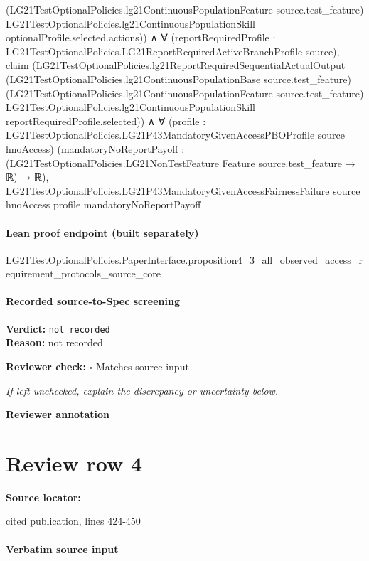 \documentclass[10pt]{article}
\newcommand{\reviewerbox}{%
  \par\noindent\fbox{\parbox{0.96\linewidth}{\rule{0pt}{0.38in}}}\par
}
\newcommand{\reviewmatch}[1]{%
  \par\noindent\textbf{Reviewer check:} $\square$\; #1\par
  \noindent\emph{If left unchecked, explain the discrepancy or uncertainty below.}\par
}
\begin{document}
\begin{ReviewVerbatim}
              (LG21TestOptionalPolicies.lg21ContinuousPopulationFeature source.test_feature)
              LG21TestOptionalPolicies.lg21ContinuousPopulationSkill optionalProfile.selected.actions)) ∧
        ∀ (reportRequiredProfile : LG21TestOptionalPolicies.LG21ReportRequiredActiveBranchProfile source),
          claim
            (LG21TestOptionalPolicies.lg21ReportRequiredSequentialActualOutput
              (LG21TestOptionalPolicies.lg21ContinuousPopulationBase source.test_feature)
              (LG21TestOptionalPolicies.lg21ContinuousPopulationFeature source.test_feature)
              LG21TestOptionalPolicies.lg21ContinuousPopulationSkill reportRequiredProfile.selected)) ∧
      ∀ (profile : LG21TestOptionalPolicies.LG21P43MandatoryGivenAccessPBOProfile source hnoAccess)
        (mandatoryNoReportPayoff : (LG21TestOptionalPolicies.LG21NonTestFeature Feature source.test_feature → ℝ) → ℝ),
        LG21TestOptionalPolicies.LG21P43MandatoryGivenAccessFairnessFailure source hnoAccess profile
          mandatoryNoReportPayoff
\end{ReviewVerbatim}

\paragraph{Lean proof endpoint (built separately)}\begin{ReviewVerbatim}
LG21TestOptionalPolicies.PaperInterface.proposition4_3_all_observed_access_requirement_protocols_source_core
\end{ReviewVerbatim}

\paragraph{Recorded source-to-Spec screening}
\textbf{Verdict:} \texttt{not recorded}
\\
\textbf{Reason:} not recorded
\reviewmatch{Matches source input}
\noindent\textbf{Reviewer annotation}\par
\reviewerbox
\clearpage
\hypertarget{source-claim-c1ab3f67a9da6144}{}
\section*{Review row 4}
\textbf{Source locator:} {\footnotesize\raggedright cited publication, lines 424-\allowbreak{}450\par}
\paragraph{Verbatim source input}
\begin{ReviewVerbatim}
\end{ReviewVerbatim}
\end{document}
